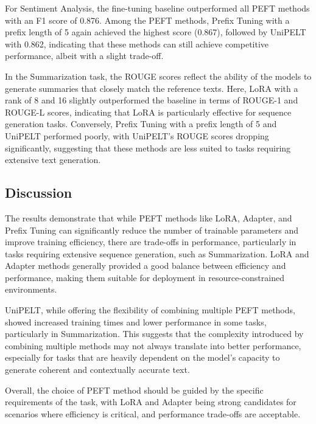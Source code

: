 For Sentiment Analysis, the fine-tuning baseline outperformed all PEFT methods with an F1 score of 0.876. Among the PEFT methods, Prefix Tuning with a prefix length of 5 again achieved the highest score (0.867), followed by UniPELT with 0.862, indicating that these methods can still achieve competitive performance, albeit with a slight trade-off.

In the Summarization task, the ROUGE scores reflect the ability of the models to generate summaries that closely match the reference texts. Here, LoRA with a rank of 8 and 16 slightly outperformed the baseline in terms of ROUGE-1 and ROUGE-L scores, indicating that LoRA is particularly effective for sequence generation tasks. Conversely, Prefix Tuning with a prefix length of 5 and UniPELT performed poorly, with UniPELT's ROUGE scores dropping significantly, suggesting that these methods are less suited to tasks requiring extensive text generation.

\subsection{Discussion}

The results demonstrate that while PEFT methods like LoRA, Adapter, and Prefix Tuning can significantly reduce the number of trainable parameters and improve training efficiency, there are trade-offs in performance, particularly in tasks requiring extensive sequence generation, such as Summarization. LoRA and Adapter methods generally provided a good balance between efficiency and performance, making them suitable for deployment in resource-constrained environments.

UniPELT, while offering the flexibility of combining multiple PEFT methods, showed increased training times and lower performance in some tasks, particularly in Summarization. This suggests that the complexity introduced by combining multiple methods may not always translate into better performance, especially for tasks that are heavily dependent on the model's capacity to generate coherent and contextually accurate text.

Overall, the choice of PEFT method should be guided by the specific requirements of the task, with LoRA and Adapter being strong candidates for scenarios where efficiency is critical, and performance trade-offs are acceptable.
